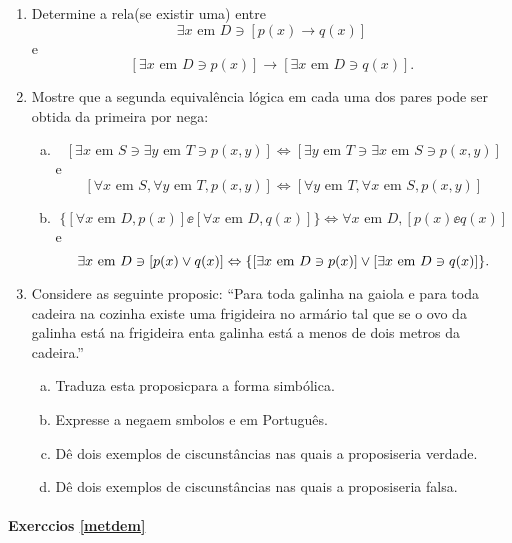 \begin{enumerate}[{\bf 1.}]
\item Determine a rela\cao (se existir uma) entre
\[
\exists x \textrm{ em } D \ni [p(x)\to q(x)]
\]
e
\[
[\exists x \textrm{ em } D \ni p(x)]\to[\exists x \textrm{ em } D \ni q(x)].
\]

\item Mostre que a segunda equival\^encia l\'ogica em cada uma dos pares pode ser obtida da primeira por nega\caoi: 
\begin{enumerate}[a)]
\item 
\[
[\exists x \textrm{ em } S \ni \exists y \textrm{ em } T \ni p(x,y)]\Leftrightarrow[\exists y \textrm{ em } T \ni \exists x \textrm{ em } S \ni p(x,y)]
\]
e
\[
[\forall x \textrm{ em } S, \forall y \textrm{ em } T, p(x,y)]\Leftrightarrow[\forall y \textrm{ em } T, \forall x \textrm{ em } S, p(x,y)]
\]

\item 
\[
\{[\forall x \textrm{ em } D, p(x)]\ee[\forall x \textrm{ em } D, q(x)]\}\Leftrightarrow \forall x \textrm{ em } D, [p(x)\ee q(x)]
\]
e
\[
\exists x \textrm{ em } D \ni [p(x)\vee q(x)]\Leftrightarrow\{[\exists x \textrm{ em } D \ni p(x)]\vee[\exists x \textrm{ em } D \ni q(x)]\}.
\]
\end{enumerate}

\item Considere as seguinte proposic\aoi: ``Para toda galinha na gaiola e para toda cadeira na cozinha existe uma frigideira no arm\'ario tal que se o ovo da galinha est\'a na frigideira ent\ao a galinha est\'a a menos de dois metros da cadeira.''
\begin{enumerate}[a)]
\item Traduza esta proposic\ao para a forma simb\'olica.
\item Expresse a nega\cao em s\ih mbolos e em Portugu\^es.
\item D\^e dois exemplos de ciscunst\^ancias nas quais a proposi\cao seria verdade.
\item D\^e dois exemplos de ciscunst\^ancias nas quais a proposi\cao seria falsa.
\end{enumerate}
\end{enumerate}
\paragraph{Exerc\ih cios \ref{metdem}}

